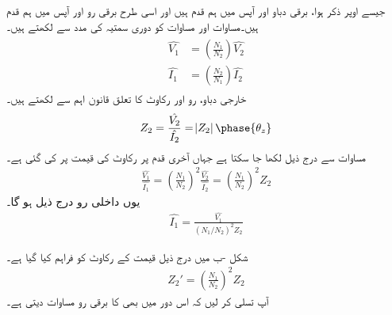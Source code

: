 جیسے اوپر ذکر ہوا، برقی دباو  اور  آپس میں ہم قدم ہیں اور  اسی طرح برقی رو  اور  آپس میں  ہم قدم ہیں۔مساوات  اور  مساوات    کو دوری سمتیہ کی مدد سے لکھتے ہیں۔
\begin{gather}
\begin{aligned}\label{مساوات_ٹرانسفارمر_دباو_رو_الف}
\hat{V_1}&=\left(\frac{N_1}{N_2} \right) \hat{V_2}\\
\hat{I_1}&=\left(\frac{N_2}{N_1} \right) \hat{I_2}
\end{aligned}
\end{gather}
خارجی دباو، رو اور رکاوٹ کا تعلق قانون اہم سے لکھتے ہیں۔
\begin{align}
Z_2=\frac{\hat{V_2}}{\hat{I_2}}=\abs{Z_2}\phase{\theta_z}
\end{align}
مساوات   سے درج ذیل لکھا جا سکتا ہے جہاں آخری قدم پر رکاوٹ کی قیمت پر کی گئی ہے۔
\begin{align}\label{مساوات_ٹرانسفارمر_تبادلہ_رکاوٹ_الف}
\frac{\hat{V_1}}{\hat{I_1}}=\left(\frac{N_1}{N_2} \right)^2 \frac{\hat{V_2}}{\hat{I_2}}=\left(\frac{N_1}{N_2} \right)^2  Z_2
\end{align}
یوں  داخلی رو درج ذیل ہو گا۔
\begin{align}\label{مساوات_ٹرانسفارمر_تبادلہ_رکاوٹ_ب}
\hat{I_1}=\frac{\hat{V_1}}{(N_1/N_2 )^2  Z_2}
\end{align}

شکل -ب میں  درج ذیل قیمت کے رکاوٹ  کو فراہم کیا گیا ہے۔ 
\begin{align}\label{مساوات_ٹرانسفارمر_متبادل_رکاوٹ_تعریف}
Z_2'=\left(\frac{N_1}{N_2} \right)^2  Z_2
\end{align}
آپ تسلی کر لیں کہ اس دور میں بھی   کا برقی رو مساوات  دیتی ہے۔

